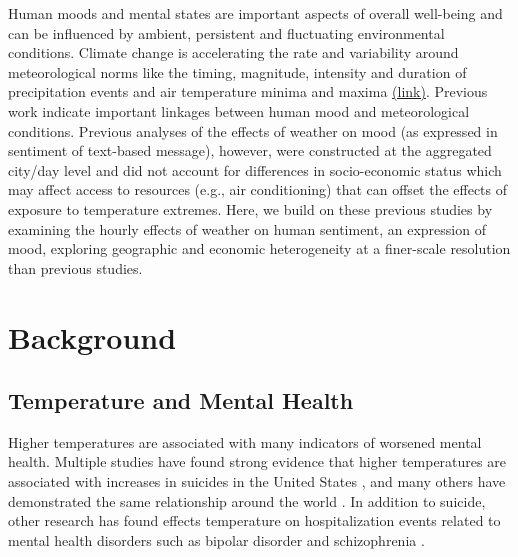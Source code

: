 \documentclass{article}
\begin{document}
Human moods and mental states are important aspects of overall well-being and can be influenced by ambient, persistent and fluctuating environmental conditions. Climate change is accelerating the rate and variability around meteorological norms like the timing, magnitude, intensity and duration of precipitation events and air temperature minima and maxima \href{https://www.ipcc.ch/site/assets/uploads/2018/03/SREX-Chap3_FINAL-1.pdf}{(link)}. Previous work \citep{baylis_weather_2018} indicate important linkages between human mood and meteorological conditions. Previous analyses of the effects of weather on mood (as expressed in sentiment of text-based message), however, were constructed at the aggregated city/day level and did not account for differences in socio-economic status which may affect access to resources (e.g., air conditioning) that can offset the effects of exposure to temperature extremes. Here, we build on these previous studies by examining the hourly effects of weather on human sentiment, an expression of mood, exploring geographic and economic heterogeneity at a finer-scale resolution than previous studies.  

\section{Background}
\subsection{Temperature and Mental Health}

Higher temperatures are associated with many indicators of worsened mental health.  Multiple studies have found strong evidence that higher temperatures are associated with increases in suicides in the United States \citep{Burke2018Aug, Mullins2019Dec, Dixon2007May}, and many others have demonstrated the same relationship around the world \citep{Qi2014Dec, Page2007Aug, Likhvar2011Jan}.  In addition to suicide, other research has found effects temperature on hospitalization events related to mental health disorders such as bipolar disorder and schizophrenia \citep{Mullins2019Dec, Lee2007Jan, Shapira2004Feb, Sung2013Feb, Gupta1992Jun, Hansen2008Oct}.
\end{document}
